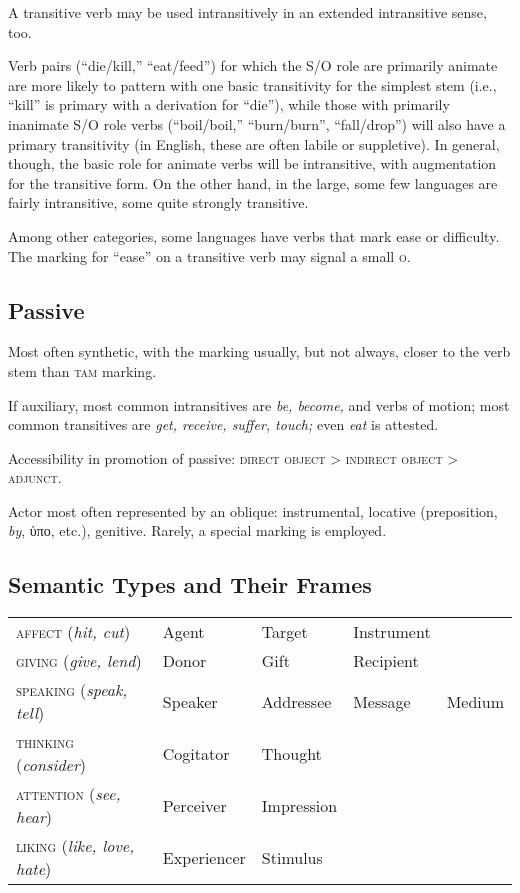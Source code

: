 \documentclass[11pt]{article}
\newcommand{\E}[1]{\textit{#1}}   %
\newcommand{\I}[1]{\textsc{#1}}   %
\begin{document}
A transitive verb may be used intransitively in an extended
intransitive sense, too.

Verb pairs (``die/kill,'' ``eat/feed'') for which the S/O role are
primarily animate are more likely to pattern with one basic
transitivity for the simplest stem (i.e., ``kill'' is primary with a
derivation for ``die''), while those with primarily inanimate S/O role
verbs (``boil/boil,'' ``burn/burn'', ``fall/drop'') will also have a
primary transitivity (in English, these are often labile or
suppletive).  In general, though, the basic role for animate verbs
will be intransitive, with augmentation for the transitive form.  On
the other hand, in the large, some few languages are fairly
intransitive, some quite strongly transitive.

Among other categories, some languages have verbs that mark ease or
difficulty.  The marking for ``ease'' on a transitive verb may signal
a small \I{o}.

\subsection{Passive} Most often synthetic, with the marking usually,
but not always, closer to the verb stem than \I{tam} marking.

If auxiliary, most common intransitives are \textit{be, become,} and
verbs of motion; most common transitives are \textit{get, receive,
  suffer, touch;} even \textit{eat} is attested.

Accessibility in promotion of passive: \I{direct object > indirect
  object > adjunct}.

Actor most often represented by an oblique: instrumental, locative
(preposition, \textit{by}, ὑπο, etc.), genitive.  Rarely, a special
marking is employed.

\subsection{Semantic Types and Their Frames}

\begin{center}
\begin{tabular}{lllll}
\I{affect} (\E{hit, cut}) & Agent & Target & Instrument \\
\I{giving} (\E{give, lend}) & Donor & Gift & Recipient \\
\I{speaking} (\E{speak, tell}) & Speaker & Addressee & Message & Medium \\
\I{thinking} (\E{consider}) & Cogitator & Thought \\
\I{attention} (\E{see, hear}) & Perceiver & Impression \\
\I{liking} (\E{like, love, hate}) & Experiencer & Stimulus
\end{tabular}
\end{center}
\end{document}

